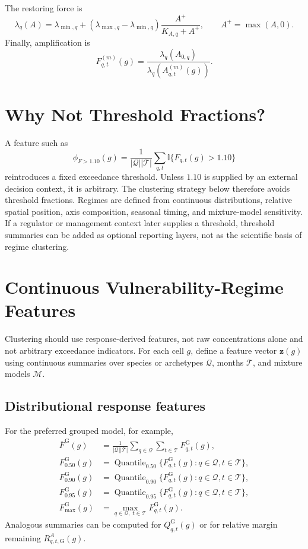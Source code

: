 \documentclass[11pt]{article}
\begin{document}
The restoring force is
\begin{equation}
\lambda_q(A)=\lambda_{\min,q}
+\left(\lambda_{\max,q}-\lambda_{\min,q}\right)
\frac{A^+}{K_{A,q}+A^+},
\qquad A^+=\max(A,0).
\end{equation}
Finally, amplification is
\begin{equation}
F_{q,t}^{(m)}(g)=\frac{\lambda_q(A_{0,q})}{\lambda_q(A_{q,t}^{(m)}(g))}.
\end{equation}

\section{Why Not Threshold Fractions?}
A feature such as
\begin{equation}
\phi_{F>1.10}(g)=\frac{1}{|\mathcal{Q}||\mathcal{T}|}\sum_{q,t}
\mathbb{I}\{F_{q,t}(g)>1.10\}
\end{equation}
reintroduces a fixed exceedance threshold. Unless $1.10$ is supplied by an external decision context,
it is arbitrary. The clustering strategy below therefore avoids threshold fractions. Regimes are defined from
continuous distributions, relative spatial position, axis composition, seasonal timing, and mixture-model
sensitivity. If a regulator or management context later supplies a threshold, threshold summaries can be
added as optional reporting layers, not as the scientific basis of regime clustering.

\section{Continuous Vulnerability-Regime Features}
Clustering should use response-derived features, not raw concentrations alone and not arbitrary exceedance
indicators. For each cell $g$, define a feature vector $\bm{z}(g)$ using continuous summaries over species
or archetypes $\mathcal{Q}$, months $\mathcal{T}$, and mixture models $\mathcal{M}$.

\subsection{Distributional response features}
For the preferred grouped model, for example,
\begin{align}
\overline{F}^{\mathrm{G}}(g)
&=\frac{1}{|\mathcal{Q}||\mathcal{T}|}\sum_{q\in\mathcal{Q}}\sum_{t\in\mathcal{T}}
F_{q,t}^{\mathrm{G}}(g),\\
F_{0.50}^{\mathrm{G}}(g)
&=\operatorname{Quantile}_{0.50}\{F_{q,t}^{\mathrm{G}}(g):q\in\mathcal{Q},t\in\mathcal{T}\},\\
F_{0.90}^{\mathrm{G}}(g)
&=\operatorname{Quantile}_{0.90}\{F_{q,t}^{\mathrm{G}}(g):q\in\mathcal{Q},t\in\mathcal{T}\},\\
F_{0.95}^{\mathrm{G}}(g)
&=\operatorname{Quantile}_{0.95}\{F_{q,t}^{\mathrm{G}}(g):q\in\mathcal{Q},t\in\mathcal{T}\},\\
F_{\max}^{\mathrm{G}}(g)
&=\max_{q\in\mathcal{Q},\;t\in\mathcal{T}}F_{q,t}^{\mathrm{G}}(g).
\end{align}
Analogous summaries can be computed for $Q_{q,t}^{\mathrm{G}}(g)$ or for relative margin remaining
$R^A_{q,t,\mathrm{G}}(g)$.
\end{document}
